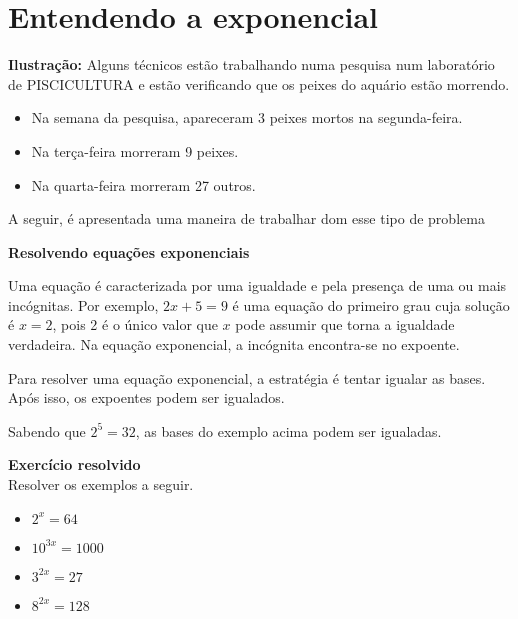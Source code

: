 \section{Entendendo a exponencial}

\noindent
\textbf{Ilustração:} Alguns técnicos estão trabalhando numa pesquisa num laboratório de PISCICULTURA e estão verificando que os peixes do aquário estão morrendo. 
\begin{itemize}
    \item Na semana da pesquisa, apareceram 3 peixes mortos na  segunda-feira.
    \item Na terça-feira morreram 9 peixes. 
    \item Na quarta-feira morreram 27 outros.
\end{itemize}

A seguir, é apresentada uma maneira de trabalhar dom esse tipo de problema

\noindent
\textbf{Resolvendo equações exponenciais}
	
Uma equação é caracterizada por uma igualdade e pela presença de uma ou mais incógnitas. Por exemplo, $2x + 5 = 9 $ é uma equação do primeiro grau cuja solução é $x=2$, pois 2 é o único valor que $x$ pode assumir que torna a igualdade verdadeira. Na equação exponencial, a incógnita encontra-se no expoente.

\begin{texample}
    \centering
\end{texample}
	
Para resolver uma equação exponencial, a estratégia é tentar igualar as bases. Após isso, os expoentes podem ser igualados.

Sabendo que $2^{5} = 32$, as bases do exemplo acima podem ser igualadas.

\begin{texample}
    \centering
\end{texample}

\noindent
\textbf{Exercício resolvido}\\
Resolver os exemplos a seguir.
\begin{itemize}
    \item $2^{x} = 64$
    \item $10^{3x} = 1000$
    \item $3^{2x} = 27$
    \item $8^{2x} = 128$
\end{itemize}


